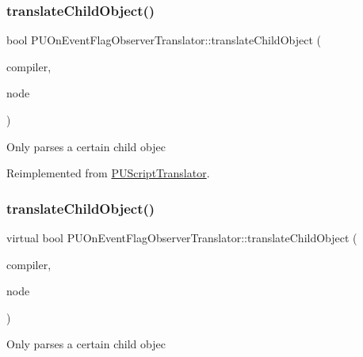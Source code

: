 \subsubsection{\texorpdfstring{translate\+Child\+Object()}{translateChildObject()}\hspace{0.1cm}{\footnotesize\ttfamily [1/2]}}
{\footnotesize\ttfamily bool P\+U\+On\+Event\+Flag\+Observer\+Translator\+::translate\+Child\+Object (\begin{DoxyParamCaption}\item[{\hyperlink{classPUScriptCompiler}{P\+U\+Script\+Compiler} $\ast$}]{compiler,  }\item[{\hyperlink{classPUAbstractNode}{P\+U\+Abstract\+Node} $\ast$}]{node }\end{DoxyParamCaption})\hspace{0.3cm}{\ttfamily [virtual]}}

Only parses a certain child objec 

Reimplemented from \hyperlink{classPUScriptTranslator_ab587d01348ae3e678cb700c719b2b113}{P\+U\+Script\+Translator}.

\mbox{\label{classPUOnEventFlagObserverTranslator_a2fcf11a556435af9a7012cc5d26db34b}} 
\subsubsection{\texorpdfstring{translate\+Child\+Object()}{translateChildObject()}\hspace{0.1cm}{\footnotesize\ttfamily [2/2]}}
{\footnotesize\ttfamily virtual bool P\+U\+On\+Event\+Flag\+Observer\+Translator\+::translate\+Child\+Object (\begin{DoxyParamCaption}\item[{\hyperlink{classPUScriptCompiler}{P\+U\+Script\+Compiler} $\ast$}]{compiler,  }\item[{\hyperlink{classPUAbstractNode}{P\+U\+Abstract\+Node} $\ast$}]{node }\end{DoxyParamCaption})\hspace{0.3cm}{\ttfamily [virtual]}}

Only parses a certain child objec 

